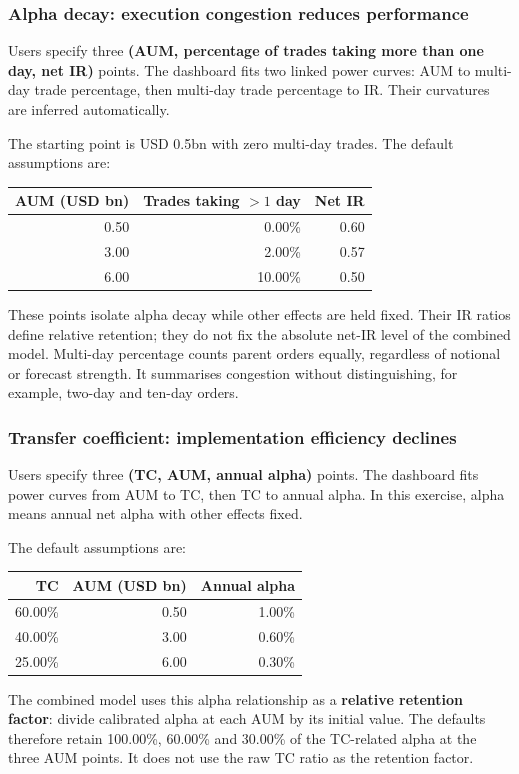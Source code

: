 \documentclass[11pt,a4paper]{article}
\begin{document}
\newpage
\subsubsection{Alpha decay: execution congestion reduces performance}
Users specify three \textbf{(AUM, percentage of trades taking more than one day, net IR)} points. The dashboard fits two linked power curves: AUM to multi-day trade percentage, then multi-day trade percentage to IR. Their curvatures are inferred automatically.

The starting point is USD 0.5bn with zero multi-day trades. The default assumptions are:
\begin{center}
\begin{tabular}{rrr}
\toprule
AUM (USD bn) & Trades taking $>1$ day & Net IR \\
\midrule
0.50 & 0.00\% & 0.60 \\
3.00 & 2.00\% & 0.57 \\
6.00 & 10.00\% & 0.50 \\
\bottomrule
\end{tabular}
\end{center}
These points isolate alpha decay while other effects are held fixed. Their IR ratios define relative retention; they do not fix the absolute net-IR level of the combined model. Multi-day percentage counts parent orders equally, regardless of notional or forecast strength. It summarises congestion without distinguishing, for example, two-day and ten-day orders.

\subsubsection{Transfer coefficient: implementation efficiency declines}
Users specify three \textbf{(TC, AUM, annual alpha)} points. The dashboard fits power curves from AUM to TC, then TC to annual alpha. In this exercise, alpha means annual net alpha with other effects fixed.

The default assumptions are:
\begin{center}
\begin{tabular}{rrr}
\toprule
TC & AUM (USD bn) & Annual alpha \\
\midrule
60.00\% & 0.50 & 1.00\% \\
40.00\% & 3.00 & 0.60\% \\
25.00\% & 6.00 & 0.30\% \\
\bottomrule
\end{tabular}
\end{center}
The combined model uses this alpha relationship as a \textbf{relative retention factor}: divide calibrated alpha at each AUM by its initial value. The defaults therefore retain 100.00\%, 60.00\% and 30.00\% of the TC-related alpha at the three AUM points. It does not use the raw TC ratio as the retention factor.
\end{document}
